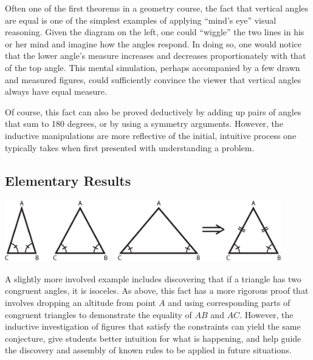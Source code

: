 
Often one of the first theorems in a geometry course, the fact that
vertical angles are equal is one of the simplest examples of applying
``mind's eye'' visual reasoning.  Given the diagram on the left, one
could ``wiggle'' the two lines in his or her mind and imagine how the
angles respond.  In doing so, one would notice that the lower angle's
measure increases and decreases proportionately with that of the top
angle.  This mental simulation, perhaps accompanied by a few drawn and
measured figures, could sufficiently convince the viewer that vertical
angles always have equal measure.

Of course, this fact can also be proved deductively by adding up pairs
of angles that sum to 180 degrees, or by using a symmetry arguments.
However, the inductive manipulations are more reflective of the
initial, intuitive process one typically takes when first presented
with understanding a problem.

\subsection{Elementary Results}
\label{sec:elem}

\begin{center}
\includegraphics[width=0.9\textwidth]{diagrams/isoceles-triangle.eps}
\end{center}


A slightly more involved example includes discovering that if a
triangle has two congruent angles, it is isoceles.  As above, this
fact has a more rigorous proof that involves dropping an altitude from
point $A$ and using corresponding parts of congruent triangles to
demonstrate the equality of $AB$ and $AC$.  However, the inductive
investigation of figures that satisfy the constraints can yield the
same conjecture, give students better intuition for what is happening,
and help guide the discovery and assembly of known rules to be applied
in future situations.

